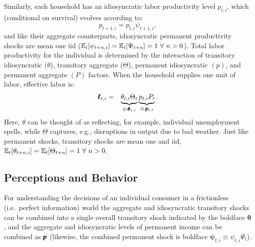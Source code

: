 \documentclass[titlepage]{./econtex}
\begin{document}
Similarly, each household has an idiosyncratic labor productivity level $p_{t,i}$, which (conditional on survival) evolves according to:
\begin{equation}
p_{t+1,i} = p_{t,i} \psi_{t+1,i},  \label{eq:IndRandWalk}
\end{equation}
and like their aggregate counterparts, idiosyncratic permanent productivity shocks are mean
one iid ($\operatorname{\mathbb{E}}_{t}[\psi_{t+n,i}]=\operatorname{\mathbb{E}}_{t}[\Psi_{t+n}]= 1~\forall ~n>0$).
Total labor productivity for the individual is determined by the interaction of transitory idiosyncratic
($\theta$), transitory aggregate ($\Theta$), permanent idiosyncratic $({p})$, and permanent aggregate
$({P})$ factors.  When the household supplies one unit of labor, effective labor is:
\begin{eqnarray}
  \label{eq:ell}
   \pmb{\ell}_{t,i} & = & \underbrace{\theta_{t,i}\Theta_{t}}_{\equiv\,\pmb{\theta}_{t,i}}\underbrace{{p}_{t,i} {P}_{t}}_{\equiv\,\pmb{p}_{t,i}}.
\end{eqnarray}
  Here, $\theta$ can be thought of as reflecting, for example, individual unemployment spells, while $\Theta$ captures, e.g., disruptions in output due to bad weather.  Just like permanent shocks, transitory shocks are mean one and iid, $\operatorname{\mathbb{E}}_{t}[\theta_{t+n,i}]=\operatorname{\mathbb{E}}_{t}[\Theta_{t+n}]=1~\forall~n>0$.  


\subsection{Perceptions and Behavior}

For understanding the decisions of an individual consumer in a frictionless (i.e.\ perfect information) world the aggregate and idiosyncratic transitory shocks can be combined into a single overall transitory shock indicated by the boldface $\pmb{\theta}$, and the aggregate and idiosyncratic levels of permanent income can be combined as $\pmb{p}$ (likewise, the combined permanent shock is boldface $\pmb{\psi}_{t,i}\equiv \psi_{t,i} \Psi_{t}$).
\end{document}
